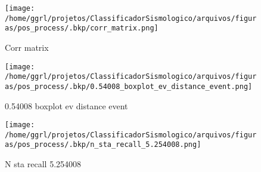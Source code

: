                     \begin{figure}[H]
                        \centering
                        \texttt{[image: /home/ggrl/projetos/ClassificadorSismologico/arquivos/figuras/pos\_process/.bkp/corr\_matrix.png]}
                        \caption{Corr matrix}
                        \label{fig:corr_matrix}
                    \end{figure}
                

                    \begin{figure}[H]
                        \centering
                        \texttt{[image: /home/ggrl/projetos/ClassificadorSismologico/arquivos/figuras/pos\_process/.bkp/0.54008\_boxplot\_ev\_distance\_event.png]}
                        \caption{0.54008 boxplot ev distance event}
                        \label{fig:0.54008_boxplot_ev_distance_event}
                    \end{figure}
                

                    \begin{figure}[H]
                        \centering
                        \texttt{[image: /home/ggrl/projetos/ClassificadorSismologico/arquivos/figuras/pos\_process/.bkp/n\_sta\_recall\_5.254008.png]}
                        \caption{N sta recall 5.254008}
                        \label{fig:n_sta_recall_5.254008}
                    \end{figure}
                